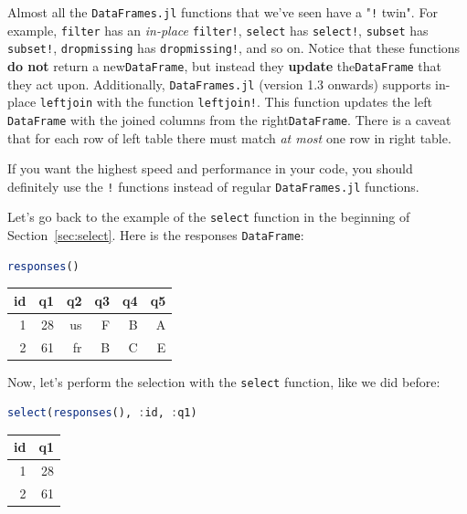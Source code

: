 \documentclass[
  notoc %
]{tufte-book}
\newcommand{\passthrough}[1]{#1}
\begin{document}
Almost all the \passthrough{\lstinline!DataFrames.jl!} functions that
we've seen have a "\passthrough{\lstinline"!"} twin". For example,
\passthrough{\lstinline!filter!} has an \emph{in-place}
\passthrough{\lstinline"filter!"}, \passthrough{\lstinline!select!} has
\passthrough{\lstinline"select!"}, \passthrough{\lstinline!subset!} has
\passthrough{\lstinline"subset!"}, \passthrough{\lstinline!dropmissing!}
has \passthrough{\lstinline"dropmissing!"}, and so on. Notice that these
functions \textbf{do not} return a
new\passthrough{\lstinline!DataFrame!}, but instead they \textbf{update}
the\passthrough{\lstinline!DataFrame!} that they act upon. Additionally,
\passthrough{\lstinline!DataFrames.jl!} (version 1.3 onwards) supports
in-place \passthrough{\lstinline!leftjoin!} with the function
\passthrough{\lstinline"leftjoin!"}. This function updates the left
\passthrough{\lstinline!DataFrame!} with the joined columns from the
right\passthrough{\lstinline!DataFrame!}. There is a caveat that for
each row of left table there must match \emph{at most} one row in right
table.

If you want the highest speed and performance in your code, you should
definitely use the \passthrough{\lstinline"!"} functions instead of
regular \passthrough{\lstinline!DataFrames.jl!} functions.

Let's go back to the example of the \passthrough{\lstinline!select!}
function in the beginning of Section~\ref{sec:select}. Here is the
responses \passthrough{\lstinline!DataFrame!}:

\begin{lstlisting}[language=Julia]
responses()
\end{lstlisting}

\begin{longtable}[]{@{}rrrrrr@{}}
\toprule
id & q1 & q2 & q3 & q4 & q5 \\
\midrule
\endhead
1 & 28 & us & F & B & A \\
2 & 61 & fr & B & C & E \\
\bottomrule
\end{longtable}

Now, let's perform the selection with the
\passthrough{\lstinline!select!} function, like we did before:

\begin{lstlisting}[language=Julia]
select(responses(), :id, :q1)
\end{lstlisting}

\begin{longtable}[]{@{}rr@{}}
\toprule
id & q1 \\
\midrule
\endhead
1 & 28 \\
2 & 61 \\
\bottomrule
\end{longtable}
\end{document}
